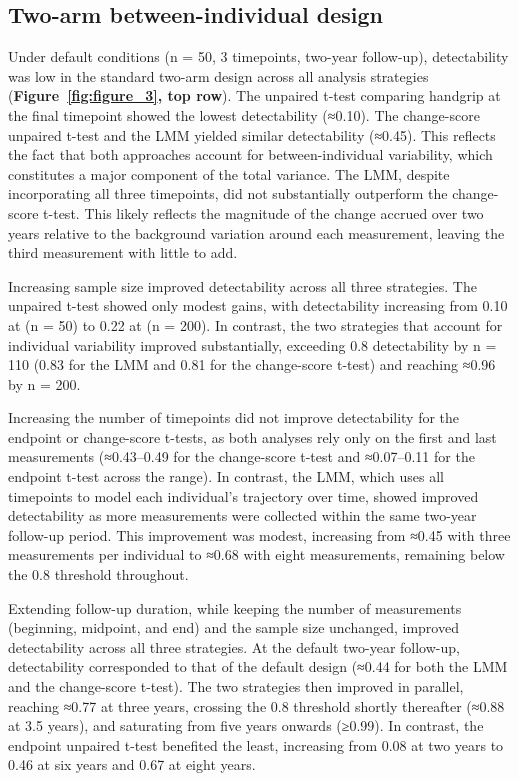 \documentclass[twocolumn]{article} %
\begin{document}
\subsection{Two-arm between-individual design}
Under default conditions (n = 50, 3 timepoints, two-year follow-up), detectability was low in the standard two-arm design across all analysis strategies (\textbf{Figure~\ref{fig:figure_3}, top row}). The unpaired t-test comparing handgrip at the final timepoint showed the lowest detectability (≈0.10). The change-score unpaired t-test and the LMM yielded similar detectability (≈0.45). This reflects the fact that both approaches account for between-individual variability, which constitutes a major component of the total variance. The LMM, despite incorporating all three timepoints, did not substantially outperform the change-score t-test. This likely reflects the magnitude of the change accrued over two years relative to the background variation around each measurement, leaving the third measurement with little to add.

Increasing sample size improved detectability across all three strategies. The unpaired t-test showed only modest gains, with detectability increasing from 0.10 at (n = 50) to 0.22 at (n = 200). In contrast, the two strategies that account for individual variability improved substantially, exceeding 0.8 detectability by n = 110 (0.83 for the LMM and 0.81 for the change-score t-test) and reaching ≈0.96 by n = 200.

Increasing the number of timepoints did not improve detectability for the endpoint or change-score t-tests, as both analyses rely only on the first and last measurements (≈0.43–0.49 for the change-score t-test and ≈0.07–0.11 for the endpoint t-test across the range). In contrast, the LMM, which uses all timepoints to model each individual's trajectory over time, showed improved detectability as more measurements were collected within the same two-year follow-up period. This improvement was modest, increasing from ≈0.45 with three measurements per individual to ≈0.68 with eight measurements, remaining below the 0.8 threshold throughout.

Extending follow-up duration, while keeping the number of measurements (beginning, midpoint, and end) and the sample size unchanged, improved detectability across all three strategies. At the default two-year follow-up, detectability corresponded to that of the default design (≈0.44 for both the LMM and the change-score t-test). The two strategies then improved in parallel, reaching ≈0.77 at three years, crossing the 0.8 threshold shortly thereafter (≈0.88 at 3.5 years), and saturating from five years onwards (≥0.99). In contrast, the endpoint unpaired t-test benefited the least, increasing from 0.08 at two years to 0.46 at six years and 0.67 at eight years.
\end{document}
